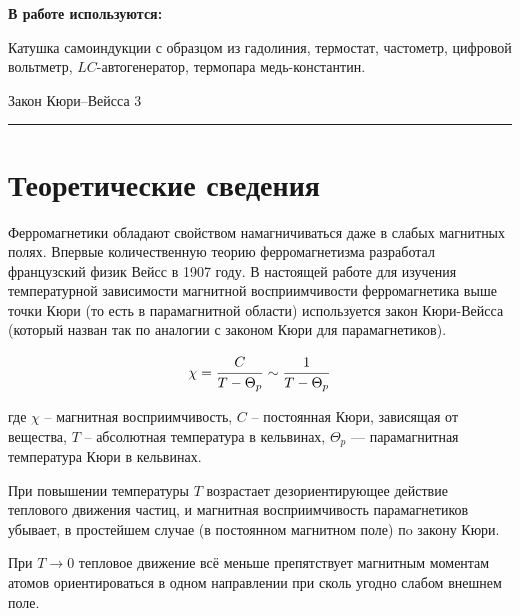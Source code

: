 \documentclass[12pt,a4paper]{scrartcl}
\begin{document}
	\textbf{В работе используются:}
	
	Катушка самоиндукции с образцом из гадолиния, термостат, частометр, цифровой вольтметр, $LC$-автогенератор, термопара медь-константин.
	
	\newpage
	
	
	\begin{flushleft}
		\footnotesize{Закон Кюри–Вейсса} \hspace{\fill} \footnotesize{3}
		\\[-0.3cm]\noindent\rule{\textwidth}{0.3pt}
	\end{flushleft}
	
	\section{Теоретические сведения}
	
	Ферромагнетики обладают свойством намагничиваться даже в слабых магнитных полях.
	Впервые количественную теорию ферромагнетизма разработал французский физик Вейсс в
	1907 году. В настоящей работе для изучения температурной зависимости магнитной восприимчивости ферромагнетика выше точки Кюри (то есть в парамагнитной области) используется
	закон Кюри-Вейсса (который назван так по аналогии с законом Кюри для парамагнетиков).
	
	\begin{equation}
		\chi = \dfrac{\strut C}{\strut T - \Theta_p} \sim \dfrac{\strut 1}{\strut T - \Theta_p}
	\end{equation}
	
	где $\chi$ -- магнитная восприимчивость, $C$ -- постоянная Кюри, зависящая от вещества, $T$ --
	абсолютная температура в кельвинах, $\Theta_p$ — парамагнитная температура Кюри в кельвинах.
	
	При повышении температуры $T$ возрастает дезориентирующее действие теплового движения частиц, и магнитная восприимчивость парамагнетиков убывает, в простейшем случае (в постоянном магнитном поле) пo закону Кюри.
	
	При $T \rightarrow 0$ тепловое движение всё меньше препятствует магнитным моментам атомов ориентироваться
	в одном направлении при сколь угодно слабом внешнем поле. 
	
\end{document}
